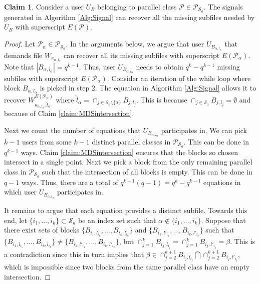 \documentclass[journal,twocolumn]{IEEEtran}
\theoremstyle{definition}
\newtheorem{claim}{Claim}
\newcommand{\calP}{\mathcal{P}}
\newcommand{\calS}{\mathcal{S}}
\begin{document}
\begin{claim}
\label{claim:signalgeneration}
Consider a user $U_B$ belonging to parallel class $\calP \in \calP_{\calS_a}$. The signals generated in  Algorithm \ref{Alg:Signal} can recover all the missing subfiles needed by $U_B$
with superscript $E(\calP)$.
\end{claim}
\begin{proof}
    Let $\calP_\alpha \in \calP_{\calS_a}$. In the arguments below, we argue that user $U_{B_{\alpha,l_\alpha}}$ that demands file $W_{\kappa_{\alpha,l_\alpha}}$ can recover all its missing subfiles with superscript $E(\calP_\alpha)$.
    Note that $|B_{\alpha,l_\alpha}| = q^{k-1}$. Thus, user $U_{B_{\alpha,l_{\alpha}}}$ needs to obtain $q^k-q^{k-1}$ missing subfiles with superscript $E(\calP_\alpha)$.
    Consider an iteration of the while loop where block $B_{\alpha,l_\alpha}$ is picked in step 2.
    The equation in Algorithm \ref{Alg:Signal} allows it to recover $W^{E(\calP_\alpha)}_{\kappa_{\alpha,l_\alpha},\hat{l}_{\alpha}}$ where $\hat{l}_{\alpha} = \cap_{j \in \calS_a \setminus \{\alpha\}}B_{j,l_j}$.
    This is because $\cap_{j \in \calS_a} B_{j,l_j} = \emptyset$ and because of Claim \ref{claim:MDSintersection}.

    	
    Next we count the number of equations that $U_{B_{\alpha,l_{\alpha}}}$ participates in. We can pick $k-1$ users from some $k-1$ distinct parallel classes in $\calP_{\calS_a}$. This can be done in $q^{k-1}$ ways. Claim \ref{claim:MDSintersection} ensures that the blocks so chosen intersect in a single point. Next we pick a block from the only remaining parallel class in $\calP_{\calS_a}$ such that the intersection of all blocks is empty. This can be done in $q-1$ ways. Thus, there are a total of $q^{k-1}(q-1) = q^k - q^{k-1}$ equations in which user $U_{B_{\alpha,l_\alpha}}$ participates in.
    	
    It remains to argue that each equation provides a distinct subfile. Towards this end, let $\{i_1, \dots, i_k\} \subset \calS_a$ be an index set such that $\alpha \notin \{i_1, \dots, i_k\}$. Suppose that there exist sets of blocks $\{B_{i_1,l_{i_1}},\dots, B_{i_{k},l_{i_{k}}}\}$ and $\{B_{i_1,l'_{i_1}}, \dots, B_{i_{k},l'_{i_{k}}}\}$ such that $\{B_{i_1,l_{i_1}}, \dots, B_{i_{k},l_{i_{k}}}\}\neq \{B_{i_1,l'_{i_1}}, \dots, B_{i_{k},l'_{i_{k}}}\}$, but $\cap_{j=1}^{k} B_{i_j,l_{i_j}}=\cap_{j=1}^{k} B_{i_j,l'_{i_j}}=\beta$. This is a contradiction since this in turn implies that $\beta \in \cap_{j=2}^{k+1} B_{i_j,l_{i_j}}\bigcap \cap_{j=2}^{k+1} B_{i_j,l'_{i_j}}$, which is impossible since two blocks from the same parallel class have an empty intersection.


\end{proof}
\end{document}
